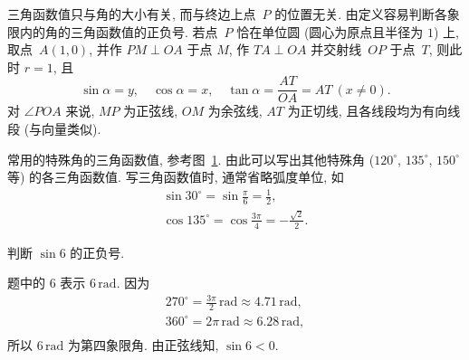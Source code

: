 三角函数值只与角的大小有关, 而与终边上点~$P$ 的位置无关. 由定义容易判断各象限内的角的三角函数值的正负号. 若点~$P$ 恰在单位圆 (圆心为原点且半径为 $1$) 上, 取点~$A(1,0)$, 并作 $PM\perp OA$ 于点 $M$, 作 $TA\perp OA$ 并交射线~$OP$ 于点~$T$, 则此时 $r=1$, 且
\[\sin\alpha= y,\quad
    \cos\alpha= x,\quad 
    \tan\alpha= \frac{AT}{OA}= AT\ (x\neq 0).\]
对 $\angle{POA}$ 来说, $MP$ 为正弦线, $OM$ 为余弦线, $AT$ 为正切线, 
且各线段均为有向线段 (与向量类似). 

常用的特殊角的三角函数值, 参考图~\ref{fig-190421-1140}. 由此可以写出其他特殊角 ($120^\circ$, $135^\circ$, $150^\circ$ 等) 的各三角函数值. 写三角函数值时, 通常省略弧度单位, 如
\[\begin{gathered}
    \sin30^\circ= \sin\frac{\pi}6= \frac12,\\
    \cos135^\circ= \cos\frac{3\pi}4= -\frac{\sqrt2}2.
\end{gathered}\] 

\begin{figure}[hb]
    \centering\small
    \caption{}\label{fig-190421-1140}
\end{figure}

\lianxi
\begin{exercise}
    判断 $\sin6$ 的正负号.
\end{exercise}
\beginsolution
    题中的 $6$ 表示 $6\,\mathrm{rad}$.
    因为
    \[\begin{gathered}
        270^\circ= \frac{3\pi}2\,\mathrm{rad}
            \approx 4.71\,\mathrm{rad},\\
        360^\circ= 2\pi\,\mathrm{rad}
            \approx 6.28\,\mathrm{rad},\\
    \end{gathered}\]
    所以 $6\,\mathrm{rad}$ 为第四象限角. 由正弦线知, $\sin 6<0$.
\endsolution

